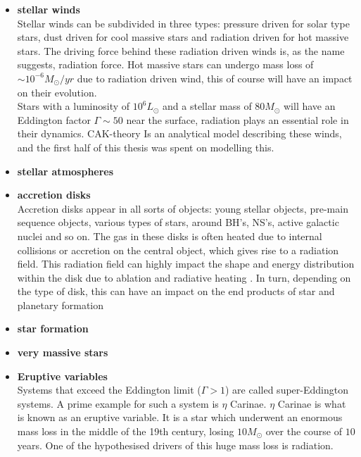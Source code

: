 \begin{itemize}
\item \textbf{stellar winds}\\
Stellar winds can be subdivided in three types: pressure driven for solar type stars, dust driven for cool massive stars and radiation driven for hot massive stars. The driving force behind these radiation driven winds is, as the name suggests, radiation force. Hot massive stars can undergo mass loss of $\sim 10^{-6} M_\odot/yr$ due to radiation driven wind, this of course will have an impact on their evolution. \\
Stars with a luminosity of $10^6 L_\odot$ and a stellar mass of $80 M_\odot$ will have an Eddington factor $\Gamma \sim 50$ near the surface, radiation plays an essential role in their dynamics.
CAK-theory Is an analytical model describing these winds, and the first half of this thesis was spent on modelling this.\\

\item \textbf{stellar atmospheres}\\

\item \textbf{accretion disks}\\
Accretion disks appear in all sorts of objects: young stellar objects, pre-main sequence objects, various types of stars, around BH's, NS's, active galactic nuclei and so on. The gas in these disks is often heated due to internal collisions or accretion on the central object, which gives rise to a radiation field. This radiation field can highly impact the shape and energy distribution within the disk due to ablation and radiative heating \cite{dylan}. In turn, depending on the type of disk, this can have an impact on the end products of star and planetary formation

\item \textbf{star formation}\\

\item \textbf{very massive stars}\\

\item \textbf{Eruptive variables}\\
Systems that exceed the Eddington limit ($\Gamma > 1$) are called super-Eddington systems. A prime example for such a system is $\eta$ Carinae. $\eta$ Carinae is what is known as an eruptive variable. It is a star which underwent an enormous mass loss in the middle of the 19th century, losing $10 M_\odot$ over the course of $10$ years. One of the hypothesised drivers of this huge mass loss is radiation.
\end{itemize}




